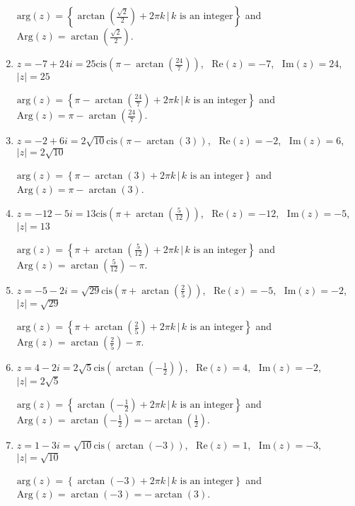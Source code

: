 \begin{enumerate}
$\text{arg}(z) = \left\{\arctan\left(\frac{\sqrt{2}}{2}\right) + 2\pi k \, | \, \text{$k$ is an integer} \right\}$ and $\text{Arg}(z) =\arctan\left(\frac{\sqrt{2}}{2}\right) $.

\item $z = -7 + 24i = 25\text{cis}\left(\pi - \arctan\left(\frac{24}{7}\right)\right)$, \, $\text{Re}(z) = -7$, \, $\text{Im}(z) = 24$, \, $|z| = 25$

$\text{arg}(z) = \left\{\pi - \arctan\left(\frac{24}{7}\right) + 2\pi k \, | \, \text{$k$ is an integer} \right\}$ and $\text{Arg}(z) =\pi - \arctan\left(\frac{24}{7}\right) $.

\item $z = -2 + 6i = 2\sqrt{10}\text{cis}\left(\pi - \arctan\left(3\right)\right)$, \, $\text{Re}(z) = -2$, \, $\text{Im}(z) = 6$, \, $|z| =2\sqrt{10}$

$\text{arg}(z) = \left\{\pi - \arctan\left(3\right) + 2\pi k \, | \, \text{$k$ is an integer} \right\}$ and $\text{Arg}(z) =\pi - \arctan\left(3\right) $.

\item $z = -12 -5i = 13\text{cis}\left(\pi + \arctan\left(\frac{5}{12}\right)\right)$, \, $\text{Re}(z) = -12$, \, $\text{Im}(z) = -5$, \, $|z| = 13$

$\text{arg}(z) = \left\{\pi +\arctan\left(\frac{5}{12}\right) + 2\pi k \, | \, \text{$k$ is an integer} \right\}$ and $\text{Arg}(z) =  \arctan\left(\frac{5}{12}\right) -\pi $.

\item $z = -5-2i = \sqrt{29}\text{cis}\left(\pi + \arctan\left(\frac{2}{5}\right)\right)$, \, $\text{Re}(z) = -5$, \, $\text{Im}(z) = -2$, \, $|z| = \sqrt{29}$

$\text{arg}(z) = \left\{\pi +\arctan\left(\frac{2}{5}\right) + 2\pi k \, | \, \text{$k$ is an integer} \right\}$ and $\text{Arg}(z) =  \arctan\left(\frac{2}{5}\right) -\pi $.

\item $z =4-2i = 2\sqrt{5}\text{cis}\left(\arctan\left(-\frac{1}{2}\right)\right)$, \, $\text{Re}(z) =4$, \, $\text{Im}(z) = -2$, \, $|z| = 2\sqrt{5}$

$\text{arg}(z) = \left\{\arctan\left(-\frac{1}{2}\right) + 2\pi k \, | \, \text{$k$ is an integer} \right\}$ and $\text{Arg}(z) = \arctan\left(-\frac{1}{2}\right) = -\arctan\left(\frac{1}{2}\right) $.

\item $z =1-3i = \sqrt{10}\text{cis}\left(\arctan\left(-3\right)\right)$, \, $\text{Re}(z) =1$, \, $\text{Im}(z) = -3$, \, $|z| =\sqrt{10}$

$\text{arg}(z) = \left\{\arctan\left(-3\right) + 2\pi k \, | \, \text{$k$ is an integer} \right\}$ and $\text{Arg}(z) =  \arctan\left(-3\right) = -\arctan(3)$.

\setcounter{HW}{\value{enumi}}

\end{enumerate}

